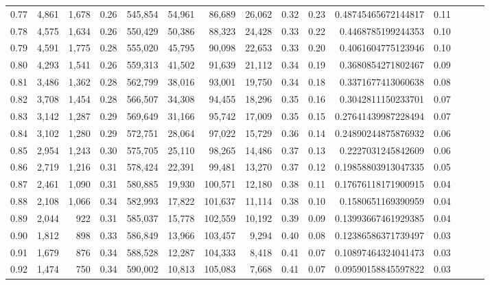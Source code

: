 \begin{tabular}{rrrrrrrrrrrrrrr}
0.77 &   4,861 &  1,678 &  0.26 &  545,854 &   54,961 &   86,689 &   26,062 &  0.32 &  0.23 &   0.48745465672144817 &      0.11 \\
0.78 &   4,575 &  1,634 &  0.26 &  550,429 &   50,386 &   88,323 &   24,428 &  0.33 &  0.22 &    0.4468785199244353 &      0.10 \\
0.79 &   4,591 &  1,775 &  0.28 &  555,020 &   45,795 &   90,098 &   22,653 &  0.33 &  0.20 &    0.4061604775123946 &      0.10 \\
0.80 &   4,293 &  1,541 &  0.26 &  559,313 &   41,502 &   91,639 &   21,112 &  0.34 &  0.19 &    0.3680854271802467 &      0.09 \\
0.81 &   3,486 &  1,362 &  0.28 &  562,799 &   38,016 &   93,001 &   19,750 &  0.34 &  0.18 &    0.3371677413060638 &      0.08 \\
0.82 &   3,708 &  1,454 &  0.28 &  566,507 &   34,308 &   94,455 &   18,296 &  0.35 &  0.16 &    0.3042811150233701 &      0.07 \\
0.83 &   3,142 &  1,287 &  0.29 &  569,649 &   31,166 &   95,742 &   17,009 &  0.35 &  0.15 &   0.27641439987228494 &      0.07 \\
0.84 &   3,102 &  1,280 &  0.29 &  572,751 &   28,064 &   97,022 &   15,729 &  0.36 &  0.14 &   0.24890244875876932 &      0.06 \\
0.85 &   2,954 &  1,243 &  0.30 &  575,705 &   25,110 &   98,265 &   14,486 &  0.37 &  0.13 &    0.2227031245842609 &      0.06 \\
0.86 &   2,719 &  1,216 &  0.31 &  578,424 &   22,391 &   99,481 &   13,270 &  0.37 &  0.12 &   0.19858803913047335 &      0.05 \\
0.87 &   2,461 &  1,090 &  0.31 &  580,885 &   19,930 &  100,571 &   12,180 &  0.38 &  0.11 &   0.17676118171900915 &      0.04 \\
0.88 &   2,108 &  1,066 &  0.34 &  582,993 &   17,822 &  101,637 &   11,114 &  0.38 &  0.10 &    0.1580651169390959 &      0.04 \\
0.89 &   2,044 &    922 &  0.31 &  585,037 &   15,778 &  102,559 &   10,192 &  0.39 &  0.09 &   0.13993667461929385 &      0.04 \\
0.90 &   1,812 &    898 &  0.33 &  586,849 &   13,966 &  103,457 &    9,294 &  0.40 &  0.08 &   0.12386586371739497 &      0.03 \\
0.91 &   1,679 &    876 &  0.34 &  588,528 &   12,287 &  104,333 &    8,418 &  0.41 &  0.07 &   0.10897464324041473 &      0.03 \\
0.92 &   1,474 &    750 &  0.34 &  590,002 &   10,813 &  105,083 &    7,668 &  0.41 &  0.07 &   0.09590158845597822 &      0.03 \\

\end{tabular}
